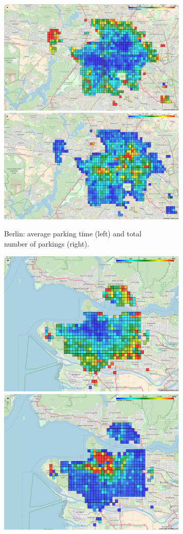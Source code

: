\begin{figure}[t!]
    \begin{center}
        \begin{subfigure}{0.56\textwidth}
		    \begin{center}
            \includegraphics[width=0.45\columnwidth]{figures/BerlinoAvgParking.pdf}
            \includegraphics[width=0.45\columnwidth]{figures/BerlinoMaxParking.pdf}                \captionsetup{justification=centering}
            \caption{Berlin: average parking time (left) and total \\ number of  parkings (right).}
            \label{fig:heatmap_Berlin}
            \end{center}
        \end{subfigure}
        \begin{subfigure}{0.41\textwidth}
		    \begin{center}
            \includegraphics[width=0.47\columnwidth]{figures/VancouverAvgParking.pdf}
            \includegraphics[width=0.47\columnwidth]{figures/VancouverMaxParking.pdf}

\end{center}
\end{subfigure}
\end{center}
\end{figure}
